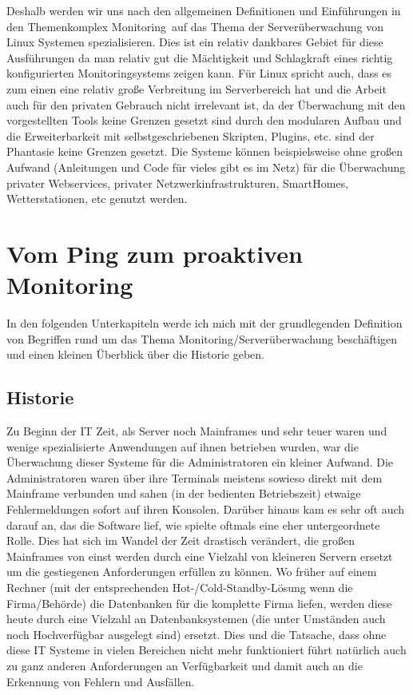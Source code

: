 \documentclass[12pt,a4paper,parskip,listof=totoc,bibliography=totoc]{scrreprt}
\begin{document}
	Deshalb werden wir uns nach den allgemeinen Definitionen und Einführungen in den Themenkomplex \glqq Monitoring\grqq\ auf das Thema der Serverüberwachung von Linux Systemen spezialisieren. Dies ist ein relativ dankbares Gebiet für diese Ausführungen da man relativ gut die Mächtigkeit und Schlagkraft eines richtig konfigurierten Monitoringsystems zeigen kann. Für Linux spricht auch, dass es zum einen eine relativ große Verbreitung im Serverbereich hat und die Arbeit auch für den privaten Gebrauch nicht irrelevant ist, da der Überwachung mit den vorgestellten Tools keine Grenzen gesetzt sind durch den modularen Aufbau und die Erweiterbarkeit mit selbstgeschriebenen Skripten, Plugins, \acrshort{etc}. sind der Phantasie keine Grenzen gesetzt. Die Systeme können beispielsweise ohne großen Aufwand (Anleitungen und Code für vieles gibt es im Netz) für die Überwachung privater Webservices, privater Netzwerkinfrastrukturen, SmartHomes, Wetterstationen, \acrshort{etc} genutzt werden.
		
	
	\chapter{Vom Ping zum proaktiven Monitoring}
	In den folgenden Unterkapiteln werde ich mich mit der grundlegenden Definition von Begriffen rund um das Thema Monitoring/Serverüberwachung beschäftigen und einen kleinen Überblick über die Historie geben.
	\section{Historie}
	Zu Beginn der IT Zeit, als Server noch Mainframes und sehr teuer waren und wenige spezialisierte Anwendungen auf ihnen betrieben wurden, war die Überwachung dieser Systeme für die Administratoren ein kleiner Aufwand. Die Administratoren waren über ihre Terminals meistens sowieso direkt mit dem Mainframe verbunden und sahen (in der bedienten Betriebszeit) etwaige Fehlermeldungen sofort auf ihren Konsolen. Darüber hinaus kam es sehr oft auch darauf an, das die Software lief, wie spielte oftmals eine eher untergeordnete Rolle. Dies hat sich im Wandel der Zeit drastisch verändert, die großen Mainframes von einst werden durch eine Vielzahl von kleineren Servern ersetzt um die gestiegenen Anforderungen erfüllen zu können. Wo früher auf einem Rechner (mit der entsprechenden Hot-/Cold-Standby-Lösung wenn die Firma/Behörde) die Datenbanken für die komplette Firma liefen, werden diese heute durch eine Vielzahl an Datenbanksystemen (die unter Umständen auch noch Hochverfügbar ausgelegt sind) ersetzt. Dies und die Tatsache, dass ohne diese IT Systeme in vielen Bereichen nicht mehr funktioniert führt natürlich auch zu ganz anderen Anforderungen an Verfügbarkeit und damit auch an die Erkennung von Fehlern und Ausfällen. 
	
\end{document}
